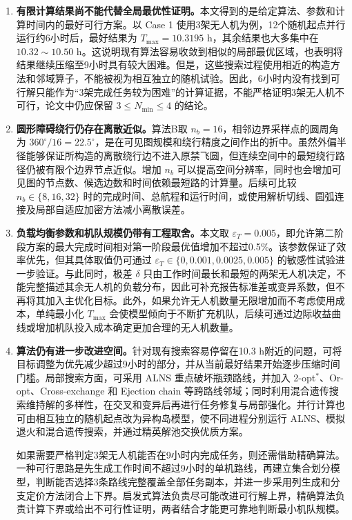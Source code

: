 \documentclass[UTF8,a4paper,12pt]{ctexart}
\numberwithin{equation}{section}
\numberwithin{equation}{section}
\begin{document}
\begin{enumerate}[label=（\arabic*）]
  \item \textbf{有限计算结果尚不能代替全局最优性证明。}本文得到的是给定算法、参数和计算时间内的最好可行方案。以 Case 1 使用3架无人机为例，12个随机起点并行运行约6小时后，最好结果为 $T_{\max}=10.3195$ h，其余结果也大多集中在 $10.32\sim10.50$ h。这说明现有算法容易收敛到相似的局部最优区域，也表明将结果继续压缩至9小时具有较大困难。但是，这些搜索过程使用相近的构造方法和邻域算子，不能被视为相互独立的随机试验。因此，6小时内没有找到可行解只能作为“3架完成任务较为困难”的计算证据，不能严格证明3架无人机不可行，论文中仍应保留 $3\leq N_{\min}\leq4$ 的结论。

  \item \textbf{圆形障碍绕行仍存在离散近似。}算法B取 $n_b=16$，相邻边界采样点的圆周角为 $360^{\circ}/16=22.5^{\circ}$，是在可见图规模和绕行精度之间作出的折中。虽然外偏半径能够保证所构造的离散绕行边不进入原禁飞圆，但连续空间中的最短绕行路径仍被有限个边界节点近似。增加 $n_b$ 可以提高空间分辨率，同时也会增加可见图的节点数、候选边数和时间依赖最短路的计算量。后续可比较 $n_b\in\{8,16,32\}$ 时的完成时间、总航程和运行时间，或使用解析切线、圆弧连接及局部自适应加密方法减小离散误差\cite{debnath2024}。

  \item \textbf{负载均衡参数和机队规模仍带有工程取舍。}本文取 $\varepsilon_T=0.005$，即允许第二阶段方案的最大完成时间相对第一阶段最优值增加不超过0.5\%。该参数保证了效率优先，但其具体取值仍可通过 $\varepsilon_T\in\{0,0.001,0.0025,0.005\}$ 的敏感性试验进一步验证。与此同时，极差 $\delta$ 只由工作时间最长和最短的两架无人机决定，不能完整描述其余无人机的负载分布，因此可补充报告标准差或变异系数，但不再将其加入主优化目标。此外，如果允许无人机数量无限增加而不考虑使用成本，单纯最小化 $T_{\max}$ 会使模型倾向于不断扩充机队，后续可通过边际收益曲线或增加机队投入成本确定更加合理的无人机数量。

  \item \textbf{算法仍有进一步改进空间。}针对现有搜索容易停留在10.3 h附近的问题，可将目标调整为优先减少超过9小时的部分，并从当前最好结果开始逐步压缩时间门槛。局部搜索方面，可采用 ALNS 重点破坏瓶颈路线，并加入 2-opt$^{*}$、Or-opt、Cross-exchange 和 Ejection chain 等跨路线邻域\cite{ropke2006alns}；同时利用混合遗传搜索维持解的多样性，在交叉和变异后再进行任务修复与局部强化\cite{vidal2012,vidal2022}。并行计算也可由相互独立的随机起点改为异构岛模型，使不同进程分别运行 ALNS、模拟退火和混合遗传搜索，并通过精英解池交换优质方案。

  如果需要严格判定3架无人机能否在9小时内完成任务，则还需借助精确算法。一种可行思路是先生成工作时间不超过9小时的单机路线，再建立集合划分模型，判断能否选择3条路线完整覆盖全部任务副本，并进一步采用列生成和分支定价方法闭合上下界\cite{feillet2010,costa2019}。启发式算法负责尽可能改进可行解上界，精确算法负责计算下界或给出不可行性证明，两者结合才能更可靠地判断最小机队规模。


\end{enumerate}
\end{document}
